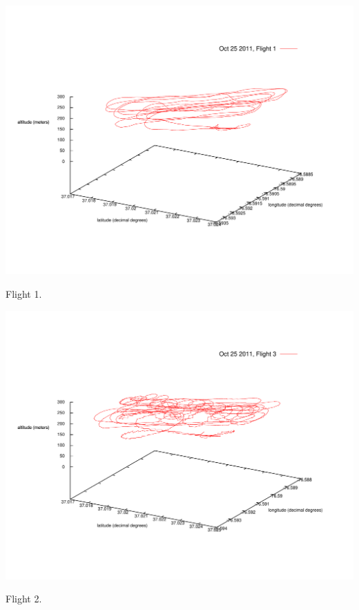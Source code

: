 \begin{myfig}[ht!]
  \centering
    \includegraphics[width=1\textwidth]{Figs/flight1}
    \caption{Flight 1.\label{fig:flight1}}
\end{myfig}%
\begin{myfig}[ht!]
 \centering
    \includegraphics[width=1\textwidth]{Figs/flight3}
    \caption{Flight 2.\label{fig:flight2}}
\end{myfig}

